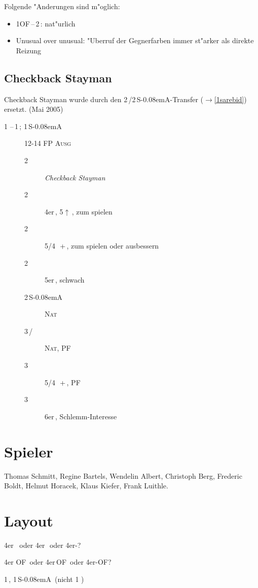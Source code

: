 \documentclass[11pt,german,twocolumn]{scrartcl}
\renewcommand{\Cl}{{\color{ClColor}{\clubs}}}
\renewcommand{\Di}{{\color{DiColor}{\sdiamonds}}}
\renewcommand{\He}{{\color{HeColor}{\shearts}}}
\renewcommand{\Sp}{{\color{SpColor}{\spades}}}
\def\pik{\,\Sp}
\def\coe{\,\He}
\def\kar{\,\Di}
\def\tre{\,\Cl}
\def\pi{\Sp}
\def\tr{\Cl}
\def\mi{\,\Cl /\Di}
\def\ra{$\rightarrow$}
\def\pl{$\uparrow$}
\def\of{\textsf{\,OF}}
\def\ofa{\textsf{OF}}
\def\sa{\textsf{S\kern-0.08emA}}
\def\SA{\,\sa}
\def\sep{\,--\,}
\newcommand{\conv}[1]{\emph{#1}}
\def\bal{\textsc{Ausg}}
\def\nat{\textsc{Nat}}
\def\pf{\textsc{PF}}
\def\bdsc{\begin{description}}
\def\edsc{\end{description}}
\begin{document}
\begin{appendix}
Folgende "Anderungen sind m"oglich:
%
\begin{itemize}
\item 1\ofa\sep2\tre: nat"urlich
\item Unusual over unusual: "Uberruf der Gegnerfarben immer st"arker als direkte Reizung
\end{itemize}

\subsection{Checkback Stayman}

Checkback Stayman wurde durch den 2\tre/2\SA-Transfer (\ra\ref{1sarebid})
ersetzt. (Mai 2005)

\bdsc
\item[1\tre\sep1\pik; 1\SA] 12-14 FP \bal
  \bdsc
  \item[2\tre] \conv{Checkback Stayman}
  \item[2\kar] 4er\pik, 5\pl{}\kar, zum spielen
  \item[2\coe] 5/4 \pik\,+\coe, zum spielen oder ausbessern
  \item[2\pik] 5er\pik, schwach
  \item[2\SA] \nat
  \item[3\mi] \nat, \pf
  \item[3\coe] 5/4 \pik\,+\coe, \pf
  \item[3\pik] 6er\pik, Schlemm-Interesse\footnotemark[1]
  \edsc
\edsc

\section{Spieler}

Thomas Schmitt,
Regine Bartels,
Wendelin Albert,
Christoph Berg,
Frederic Boldt,
Helmut Horacek,
Klaus Kiefer,
Frank Luithle.

\section{Layout}

4er \pi\ oder 4er\pik\ oder 4er-\pi?

4er \ofa\ oder 4er\of\ oder 4er-\ofa?

1\tre, 1\SA\ (nicht 1 \tr)


\end{appendix}
\end{document}
